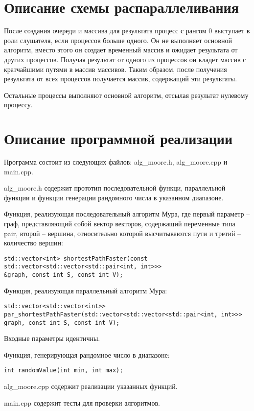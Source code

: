 \documentclass{report}
\begin{document}
\section*{Описание схемы распараллеливания}
\par После создания очереди и массива для результата процесс с рангом 0 выступает в роли слушателя, если процессов больше одного. Он не выполняет основной алгоритм, вместо этого он создает временный массив и ожидает результата от других процессов. Получая результат от одного из процессов он кладет массив с кратчайшими путями в массив массивов. Таким образом, после получения результата от всех процессов получается массив, содержащий эти результаты.
\par Остальные процессы выполняют основной алгоритм, отсылая результат нулевому процессу.
\newpage

\section*{Описание программной реализации}
Программа состоит из следующих файлов: alg\_moore.h, alg\_moore.cpp и main.cpp.
\par alg\_moore.h содержит прототип последовательной функци, параллельной функции и функции генерации рандомного числа в указанном диапазоне.
\par Функция, реализующая последовательный алгоритм Мура, где первый параметр – граф, представляющий собой вектор векторов, содержащий переменные типа pair, второй – вершина, относительно которой высчитываются пути и третий – количество вершин:
\begin{lstlisting}
std::vector<int> shortestPathFaster(const std::vector<std::vector<std::pair<int, int>>>
&graph, const int S, const int V);
\end{lstlisting}
\par Функция, реализующая параллельный алгоритм Мура:
\begin{lstlisting}
std::vector<std::vector<int>> par_shortestPathFaster(std::vector<std::vector<std::pair<int, int>>> graph, const int S, const int V);
\end{lstlisting}
\par Входные параметры идентичны.
\par Функция, генерирующая рандомное число в диапазоне:
\begin{lstlisting}
int randomValue(int min, int max);
\end{lstlisting}
\par alg\_moore.cpp содержит реализации указанных функций. 
\par main.cpp содержит тесты для проверки алгоритмов.
\newpage
\end{document}
